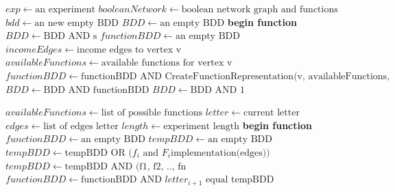 \documentclass{article}      %
\newcounter{ct}
\begin{document}
\begin{algorithm}
\begin{algorithmic}[1]
\State $exp \gets \text{an experiment}$
\State $booleanNetwork \gets \text{boolean network graph and functions}$
\State $bdd \gets \text{an new empty BDD}$
\State {}
\State $BDD \gets \text{an empty BDD}$
\State \textbf{begin function}
        \State $BDD \gets \text {BDD AND s}$
    \EndFor
\State $functionBDD \gets \text{an empty BDD}$
        \State $incomeEdges \gets \text{income edges to vertex v}$
        \State $availableFunctions \gets \text{available functions for vertex v}$
        \State $functionBDD \gets \text{functionBDD AND CreateFunctionRepresentation(v, availableFunctions, incomeEdges, experiment.length)}$
    \EndFor
\State $BDD \gets \text{BDD AND functionBDD}$
\State $BDD \gets \text{BDD AND 1}$
    \State {}
\EndIf
    \State {}
\EndFunction
\end{algorithmic}
\end{algorithm}
\begin{algorithm}
\begin{algorithmic}[1]
\State $availableFunctions \gets \text{list of possible functions}$
\State $letter \gets \text{current letter}$
\State $edges \gets \text{list of edges letter}$
\State $length \gets \text{experiment length}$
\State \textbf{begin function}
\State $functionBDD \gets \text{an empty BDD}$
        \State $tempBDD \gets \text{an empty BDD}$
            \State $tempBDD \gets \text{tempBDD OR ($f_i$ and $F_i$implementation(edges))}$
            \State {}
        \EndFor
        \State $tempBDD \gets \text{tempBDD AND (f1, f2, .., fn}$
        \State {}
        \State $functionBDD \gets \text{functionBDD AND $letter_{i+1}$ equal tempBDD}$
    \EndFor
    \State {}
\EndFunction
\end{algorithmic}
\end{algorithm}
\end{document}
